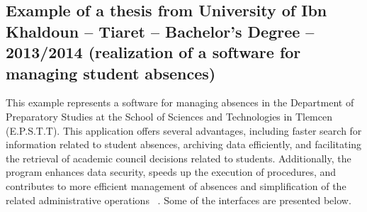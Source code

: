 \documentclass[12pt,a4paper]{report}
\begin{document}
\vspace{5cm}
\subsection{Example of a thesis from University of Ibn Khaldoun – Tiaret – Bachelor's Degree – 2013/2014
(realization of a software for managing student absences)}

This example represents a software for managing absences in the Department of Preparatory Studies at the School of Sciences and Technologies in Tlemcen (E.P.S.T.T).
This application offers several advantages, including faster search for information related to student absences, archiving data efficiently, and facilitating the retrieval of academic council decisions related to students.
Additionally, the program enhances data security, speeds up the execution of procedures, and contributes to more efficient management of absences and simplification of the related administrative operations ~\cite{mekki2014}.
Some of the interfaces are presented below.
\end{document}
